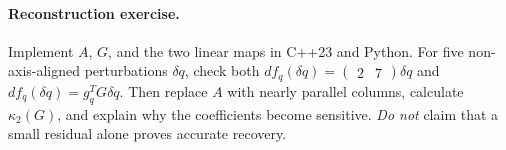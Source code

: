 \paragraph{Reconstruction exercise.}
Implement \(A\), \(G\), and the two linear maps in C++23 and Python.
For five non-axis-aligned perturbations \(\delta q\), check both
\(df_q(\delta q)=\begin{pmatrix}2&7\end{pmatrix}\delta q\)
and \(df_q(\delta q)=g_q^TG\delta q\).
Then replace \(A\) with nearly parallel columns, calculate
\(\kappa_2(G)\), and explain why the coefficients become sensitive.
\emph{Do not} claim that a small residual alone proves accurate recovery.
